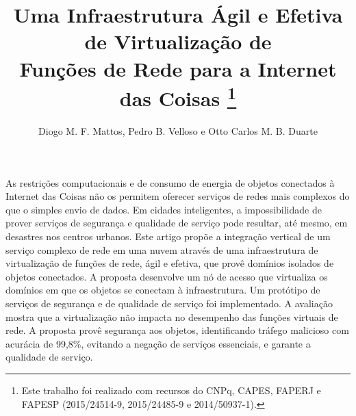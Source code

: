 \documentclass[12pt]{article}
\title{Uma Infraestrutura Ágil e Efetiva de Virtualização de \\Funções de Rede para a Internet das Coisas
\let\thefootnote\relax\footnote{Este trabalho foi realizado com recursos do CNPq, CAPES, FAPERJ e FAPESP (2015/24514-9, 2015/24485-9 e 2014/50937-1).}}
\author{
Diogo M. F. Mattos\inst{1}, 
Pedro B. Velloso\inst{2} e Otto Carlos M. B. Duarte\inst{2}\vspace{-3mm}}
\begin{document}
 

\maketitle

\begin{resumo} 
As restrições computacionais e de consumo de energia de objetos 
conectados à Internet das Coisas
não os permitem oferecer serviços de redes mais complexos do que o simples envio de dados. 
Em cidades inteligentes, a impossibilidade de prover serviços de segurança e qualidade de serviço pode resultar, até mesmo, 
em desastres nos centros urbanos.
Este artigo propõe a integração vertical de um serviço complexo 
de rede
em uma nuvem através de uma infraestrutura de virtualização de funções de rede, ágil e efetiva, que provê domínios isolados de objetos conectados. A proposta desenvolve um nó de acesso 
que virtualiza os domínios em que os objetos se conectam à infraestrutura. 
Um protótipo de serviços de segurança e de qualidade de serviço foi implementado. A avaliação mostra que a virtualização não impacta no desempenho das funções virtuais de rede. A proposta provê segurança aos objetos, identificando tráfego malicioso com acurácia de 99,8\%, evitando a negação de serviços essenciais, e garante a qualidade de serviço.




\end{resumo}
\end{document}
